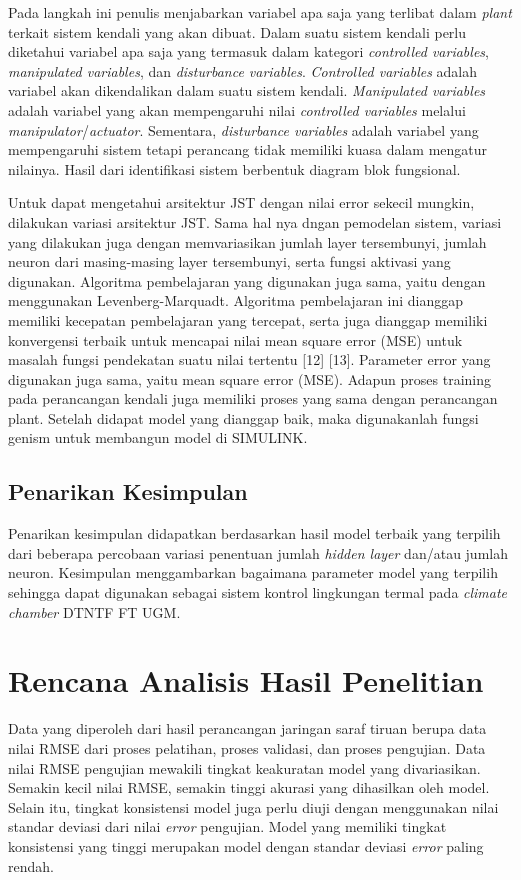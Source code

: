 Pada langkah ini penulis menjabarkan variabel apa saja yang terlibat dalam \textit{plant} terkait sistem kendali yang akan dibuat. Dalam suatu sistem kendali perlu diketahui variabel apa saja yang termasuk dalam kategori \textit{controlled variables}, \textit{manipulated variables}, dan \textit{disturbance variables}. \textit{Controlled variables} adalah variabel akan dikendalikan dalam suatu sistem kendali. \textit{Manipulated variables} adalah variabel yang akan mempengaruhi nilai \textit{controlled variables} melalui \textit{manipulator}/\textit{actuator}. Sementara, \textit{disturbance variables} adalah variabel yang mempengaruhi sistem tetapi perancang tidak memiliki kuasa dalam mengatur nilainya. Hasil dari identifikasi sistem berbentuk diagram blok fungsional.

Untuk dapat mengetahui arsitektur JST dengan nilai error sekecil mungkin, dilakukan variasi arsitektur JST. Sama hal nya dngan pemodelan sistem, variasi yang dilakukan juga dengan memvariasikan jumlah layer tersembunyi, jumlah neuron dari masing-masing layer tersembunyi, serta fungsi aktivasi yang digunakan. Algoritma pembelajaran yang digunakan juga sama, yaitu dengan menggunakan Levenberg-Marquadt. Algoritma pembelajaran ini dianggap memiliki kecepatan pembelajaran yang tercepat, serta juga dianggap memiliki konvergensi terbaik untuk mencapai nilai mean square error (MSE) untuk masalah fungsi pendekatan suatu nilai tertentu [12] [13]. Parameter error yang digunakan juga sama, yaitu mean square error (MSE). Adapun proses training pada perancangan kendali juga memiliki proses yang sama dengan perancangan plant. Setelah didapat model yang dianggap baik, maka digunakanlah fungsi genism untuk membangun model di SIMULINK.

\subsection{{Penarikan Kesimpulan}}
Penarikan kesimpulan didapatkan berdasarkan hasil model terbaik yang terpilih dari beberapa percobaan variasi penentuan jumlah \textit{hidden layer} dan/atau jumlah neuron. Kesimpulan menggambarkan bagaimana parameter model yang terpilih sehingga dapat digunakan sebagai sistem kontrol lingkungan termal pada \textit{climate chamber} DTNTF FT UGM.

\section{Rencana Analisis Hasil Penelitian}
Data yang diperoleh dari hasil perancangan jaringan saraf tiruan berupa data nilai RMSE dari proses pelatihan, proses validasi, dan proses pengujian. Data nilai RMSE pengujian mewakili tingkat keakuratan model yang divariasikan. Semakin kecil nilai RMSE, semakin tinggi akurasi yang dihasilkan oleh model. Selain itu, tingkat konsistensi model juga perlu diuji dengan menggunakan nilai standar deviasi dari nilai \textit{error} pengujian. Model yang memiliki tingkat konsistensi yang tinggi merupakan model dengan standar deviasi \textit{error} paling rendah.

